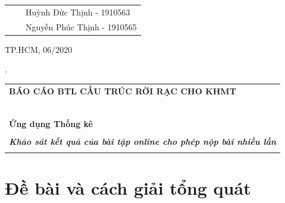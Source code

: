 \documentclass[12pt,a4paper]{article}  %
\begin{document}
\begin{titlepage}
\begin{table}[h]
\begin{tabular}{rrl}
	& & Huỳnh Đức Thịnh - 1910563 \\
	& & Nguyễn Phúc Thịnh - 1910565 \\
	
	\end{tabular}
	\end{table}
	\vspace{3cm}
	\begin{center}
	{\footnotesize TP.HCM, 06/2020}
	\end{center}
	\end{titlepage}
	\newpage


	\noindent .
	\vspace{6cm}
	
	
\begin{center}
	\begin{tabular}{c}
	\multicolumn{1}{l}{\textbf{{\Large BÁO CÁO BTL CẤU TRÚC RỜI RẠC CHO KHMT}}}\\
	~~\\
	\hline
	\\
	\multicolumn{1}{l}{\textbf{{\Large Ứng dụng Thống kê}}}\\
	\\
	\textbf{\normalsize \textit{ Khảo sát kết quả của bài tập online cho phép nộp bài nhiều lần}}\\
	\\
	\hline
	\end{tabular}
	\end{center}

	\vspace{5cm}

	\newpage

 \textit{{\Large\tableofcontents}}
 \vspace{3cm}


 
\newpage

\section{Đề bài và cách giải tổng quát} 
\end{document}
